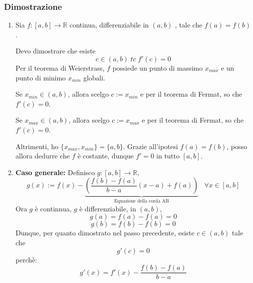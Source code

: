 \documentclass[a4paper]{article}
\theoremstyle{break}
\theoremstyle{break}
\theoremstyle{break}
\theoremstyle{break}
\begin{document}
\subsubsection{Dimostrazione}
\begin{enumerate}
  \item 
    Sia \( f: [a,b] \to \mathbb{R} \) continua, differenziabile in \( (a,b) \) , tale
    che \( f(a)=f(b) \).

    Devo dimostrare che esiste \[ c \in (a,b)\;tc\; f'(c)=0 \]
    Per il teorema di Weierstrass, \( f \) possiede un punto di massimo \( x_{max} \) 
    e un punto di minimo \( x_{min} \) globali. 

    Se \( x_{min} \in (a,b) \), allora scelgo \( c:= x_{min} \) e per il teorema di Fermat,
    so che \( f'(c)=0 \).

    Se \( x_{max} \in (a,b) \), allora scelgo \( c:=x_{max} \) e per il teorema di Fermat,
    so che \( f'(c)=0 \).

    Altrimenti, ho \( \{x_{max},x_{min}\}= \{a,b\}   \). Grazie all'ipotesi \( f(a)=f(b) \),
    posso allora dedurre che \( f \) è costante, dunque \( f'=0 \) in tutto \( [a,b] \).
  \item \textbf{Caso generale:}
    Definisco \( g: [a,b] \to \mathbb{R} \),
    \[
      g(x):= f(x)-\underbrace{\left(\frac{f(b)-f(a)}{b-a}(x-a)+f(a)\right)}_{\text{Equazione della corda AB}}\;\;\;\forall x \in [a,b]
    \] 
    Ora \( g \) è continnua, \( g \) è differenziabile, in \( (a,b) \),
    \[
      g(a)=f(a) - f(a) = 0
    \] 
    \[
      g(b) = f(b) -f(b) = 0
    \] 
    Dunque, per quanto dimostrato nel passo precedente, esiste \( c \in (a,b) \) tale che
    \[
      g'(c)=0
    \] 
    perchè:
    \[
      g'(x) = f'(x) - \frac{f(b)-f(a)}{b-a}
    \] 
\end{enumerate}
\end{document}
